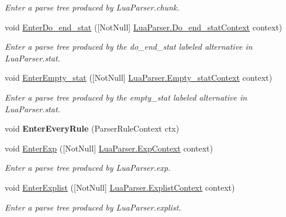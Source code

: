 \begin{DoxyCompactItemize}
\begin{DoxyCompactList}\small\item\em Enter a parse tree produced by Lua\+Parser.\+chunk. \end{DoxyCompactList}\item 
void \mbox{\hyperlink{classzlua_1_1_compiler_a6995466e1f6349319b4b822ec3579e50}{Enter\+Do\+\_\+end\+\_\+stat}} (\mbox{[}Not\+Null\mbox{]} \mbox{\hyperlink{classzlua_1_1_lua_parser_1_1_do__end__stat_context}{Lua\+Parser.\+Do\+\_\+end\+\_\+stat\+Context}} context)
\begin{DoxyCompactList}\small\item\em Enter a parse tree produced by the {\ttfamily do\+\_\+end\+\_\+stat} labeled alternative in Lua\+Parser.\+stat. \end{DoxyCompactList}\item 
void \mbox{\hyperlink{classzlua_1_1_compiler_a56016ed91d28fe91587f18764fc23b1c}{Enter\+Empty\+\_\+stat}} (\mbox{[}Not\+Null\mbox{]} \mbox{\hyperlink{classzlua_1_1_lua_parser_1_1_empty__stat_context}{Lua\+Parser.\+Empty\+\_\+stat\+Context}} context)
\begin{DoxyCompactList}\small\item\em Enter a parse tree produced by the {\ttfamily empty\+\_\+stat} labeled alternative in Lua\+Parser.\+stat. \end{DoxyCompactList}\item 
\mbox{\label{classzlua_1_1_compiler_a5b35e488ab7fa0289dd1b866c229601a}} 
void {\bfseries Enter\+Every\+Rule} (Parser\+Rule\+Context ctx)
\item 
void \mbox{\hyperlink{classzlua_1_1_compiler_a602f2e28904cb93674d854f543cff30b}{Enter\+Exp}} (\mbox{[}Not\+Null\mbox{]} \mbox{\hyperlink{classzlua_1_1_lua_parser_1_1_exp_context}{Lua\+Parser.\+Exp\+Context}} context)
\begin{DoxyCompactList}\small\item\em Enter a parse tree produced by Lua\+Parser.\+exp. \end{DoxyCompactList}\item 
void \mbox{\hyperlink{classzlua_1_1_compiler_a1ae7390644425df6bdefe1b8d7d07ceb}{Enter\+Explist}} (\mbox{[}Not\+Null\mbox{]} \mbox{\hyperlink{classzlua_1_1_lua_parser_1_1_explist_context}{Lua\+Parser.\+Explist\+Context}} context)
\begin{DoxyCompactList}\small\item\em Enter a parse tree produced by Lua\+Parser.\+explist. \end{DoxyCompactList}\item 

\end{DoxyCompactItemize}
